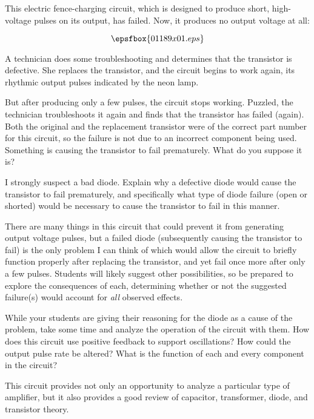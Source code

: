 

This electric fence-charging circuit, which is designed to produce short, high-voltage pulses on its output, has failed.  Now, it produces no output voltage at all:

$$\epsfbox{01189x01.eps}$$

A technician does some troubleshooting and determines that the transistor is defective.  She replaces the transistor, and the circuit begins to work again, its rhythmic output pulses indicated by the neon lamp.

But after producing only a few pulses, the circuit stops working.  Puzzled, the technician troubleshoots it again and finds that the transistor has failed (again).  Both the original and the replacement transistor were of the correct part number for this circuit, so the failure is not due to an incorrect component being used.  Something is causing the transistor to fail prematurely.  What do you suppose it is?







I strongly suspect a bad diode.  Explain why a defective diode would cause the transistor to fail prematurely, and specifically what type of diode failure (open or shorted) would be necessary to cause the transistor to fail in this manner.







There are many things in this circuit that could prevent it from generating output voltage pulses, but a failed diode (subsequently causing the transistor to fail) is the only problem I can think of which would allow the circuit to briefly function properly after replacing the transistor, and yet fail once more after only a few pulses.  Students will likely suggest other possibilities, so be prepared to explore the consequences of each, determining whether or not the suggested failure(s) would account for {\it all} observed effects.

While your students are giving their reasoning for the diode as a cause of the problem, take some time and analyze the operation of the circuit with them.  How does this circuit use positive feedback to support oscillations?  How could the output pulse rate be altered?  What is the function of each and every component in the circuit?

This circuit provides not only an opportunity to analyze a particular type of amplifier, but it also provides a good review of capacitor, transformer, diode, and transistor theory.



